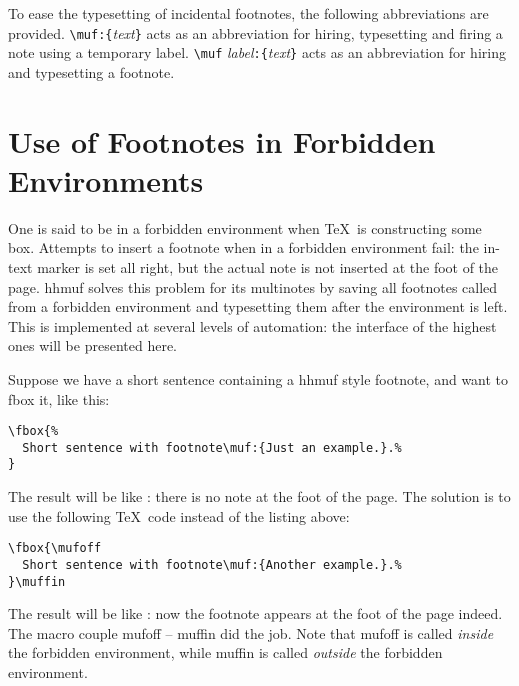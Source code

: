 \documentclass[11pt]{article}
\makeatletter
\def\packagename#1{{\sffamily #1}}     %
\def\macroname#1{{\ttfamily\@ttbs#1}}  %
\def\hhmuf{\packagename{hhmuf}\xspace}
\def\={\verb=}
\def\<#1>{\macroname{#1}}
\def\:{\linebreak[1]}
\makeatother
\begin{document}
To ease the typesetting of incidental footnotes, the following abbreviations
are provided. \=\muf=\:\=:{=\textit{text}\=}= acts as an abbreviation
for hiring, typesetting and firing a note using a temporary label.
\=\muf= \textit{label}\=:{=\textit{text}\=}= acts as an abbreviation
for hiring and typesetting a footnote.

\section{Use of Footnotes in Forbidden Environments}

One is said to be in a forbidden environment when \TeX\ is constructing
some box. Attempts to insert a footnote when in a forbidden environment
fail: the in-text marker is set all right, but the actual note is not
inserted at the foot of the page. \hhmuf solves this problem for
its multinotes by saving all footnotes called from a forbidden environment
and typesetting them after the environment is left. This is implemented
at several levels of automation: the interface of the highest ones will be
presented here.

Suppose we have a short sentence containing a \hhmuf style footnote, and
want to \<fbox> it, like this:
\begin{verbatim}
\fbox{%
  Short sentence with footnote\muf:{Just an example.}.%
}
\end{verbatim}
The result will be like : there is no note at the foot of the page. The solution
is to use the following \TeX\ code instead of the listing above:
\begin{verbatim}
\fbox{\mufoff
  Short sentence with footnote\muf:{Another example.}.%
}\muffin
\end{verbatim}
The result will be like \muffin: now the footnote appears at the foot of the page indeed.
The macro couple \<mufoff> -- \<muffin> did the job. Note that
\<mufoff> is called \emph{inside} the forbidden environment, while
\<muffin> is called \emph{outside} the forbidden environment.
\end{document}
